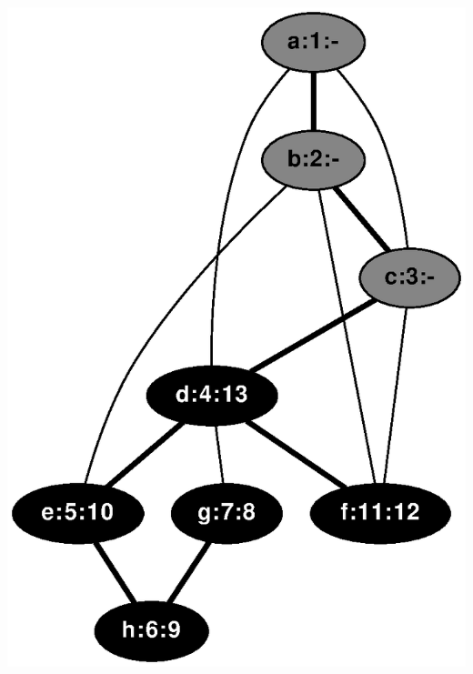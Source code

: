 \documentclass{article}
\begin{document}
\includegraphics[height=.3\textheight]{dfs_undirected_classroom_13.eps}
\vspace{1em}
\end{document}
